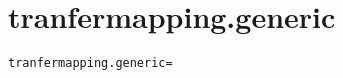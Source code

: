 \section{tranfermapping.generic}
\label{configuration:TranfermappingGeneric}
\ClearAPI
\TODO
\begin{lstlisting}[style=Props,caption={Usage example for \textit{tranfermapping.generic}}]
tranfermapping.generic=
\end{lstlisting}